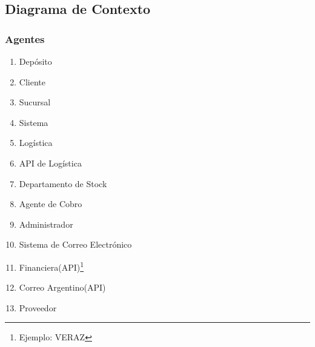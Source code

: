\subsection{Diagrama de Contexto}

\subsubsection{Agentes}

\begin{enumerate}
  \item Depósito
  \item Cliente
  \item Sucursal
  \item Sistema
  \item Logística
  \item API de Logística
  \item Departamento de Stock
  \item Agente de Cobro
  \item Administrador
  \item Sistema de Correo Electrónico
  \item Financiera(API)\footnote{Ejemplo: VERAZ}
  \item Correo Argentino(API)
  \item Proveedor
\end{enumerate}
\clearpage



